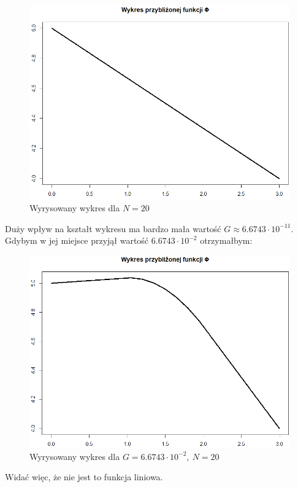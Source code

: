 \documentclass{article}
\begin{document}
\begin{figure}[h]
    \centering
    \includegraphics[width=1\linewidth]{graph1.png}
    \caption{Wyrysowany wykres dla \(N=20\)}
    \label{fig:graph1}
\end{figure}

\newpage
\noindent
Duży wpływ na kształt wykresu ma bardzo mała wartość \(G \approx 6.6743 \cdot 10^{-11}\).\\
Gdybym w jej miejsce przyjął wartość \(6.6743 \cdot 10^{-2}\) otrzymałbym:

\begin{figure}[h]
    \centering
    \includegraphics[width=1\linewidth]{graph2.png}
    \caption{Wyrysowany wykres dla \(G=6.6743 \cdot 10^{-2},\ N=20\)}
    \label{fig:graph2}
\end{figure}

\noindent
Widać więc, że nie jest to funkcja liniowa.
\end{document}
